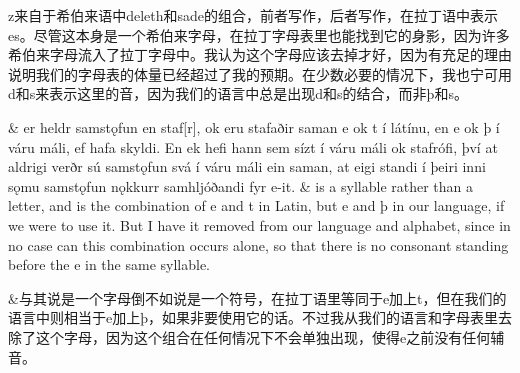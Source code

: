 \begin{translation*}{}
    z来自于希伯来语中deleth和sade的组合，前者写作，后者写作，在拉丁语中表示es。尽管这本身是一个希伯来字母，在拉丁字母表里也能找到它的身影，因为许多希伯来字母流入了拉丁字母中。我认为这个字母应该去掉才好，因为有充足的理由说明我们的字母表的体量已经超过了我的预期。在少数必要的情况下，我也宁可用d和s来表示这里的音，因为我们的语言中总是出现d和s的结合，而非þ和s。
\end{translation*}

\begin{paracol}{2}
    \& er heldr samstǫfun en staf[r], ok eru stafaðir saman e ok t í látínu, en e ok þ í váru máli, ef hafa skyldi. En ek hefi hann sem sízt í váru máli ok stafrófi, því at aldrigi verðr sú samstǫfun svá í váru máli ein saman, at eigi standi í þeiri inni sǫmu samstǫfun nǫkkurr samhljóðandi fyr e-it.
    \switchcolumn
    \& is a syllable rather than a letter, and is the combination of e and t in Latin, but e and þ in our language, if we were to use it. But I have it removed from our language and alphabet, since in no case can this combination occurs alone, so that there is no consonant standing before the e in the same syllable.
\end{paracol}
\begin{translation*}{}
    \&与其说是一个字母倒不如说是一个符号，在拉丁语里等同于e加上t，但在我们的语言中则相当于e加上þ，如果非要使用它的话。不过我从我们的语言和字母表里去除了这个字母，因为这个组合在任何情况下不会单独出现，使得e之前没有任何辅音。
\end{translation*}

